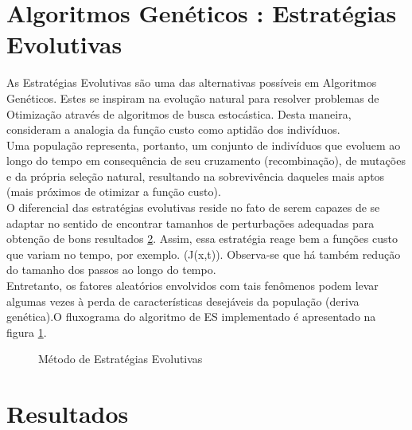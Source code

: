 \documentclass[conference,compsoc]{IEEEtran}
\begin{document}
\section{Algoritmos Genéticos : Estratégias Evolutivas}

As Estratégias Evolutivas são uma das alternativas possíveis em Algoritmos Genéticos. Estes se inspiram na evolução natural para resolver problemas de Otimização através de algoritmos de busca estocástica. Desta maneira, consideram a analogia da função custo como aptidão dos indivíduos. \\

Uma população representa, portanto, um conjunto de indivíduos que evoluem ao longo do tempo em consequência de seu cruzamento (recombinação), de mutações e da própria seleção natural, resultando na sobrevivência daqueles mais aptos (mais próximos de otimizar a função custo).\\

O diferencial das estratégias evolutivas reside no fato de serem capazes de se adaptar no sentido de encontrar tamanhos de perturbações adequadas para obtenção de bons resultados \ref{}. Assim, essa estratégia reage bem a funções custo que variam no tempo, por exemplo. (J(x,t)). Observa-se que há também redução do tamanho dos passos ao longo do tempo.\\

 Entretanto, os fatores aleatórios envolvidos com tais fenômenos podem levar algumas vezes à perda de características desejáveis da população (deriva genética).O fluxograma do algoritmo de ES implementado é apresentado na figura \ref{fig:ES_flow}.\\

\begin{figure}[!hctb]
\centering
\scalebox{0.75}{}
\caption{Método de Estratégias Evolutivas}
\label{fig:ES_flow}
\end{figure}

%


\section{Resultados}
\end{document}
